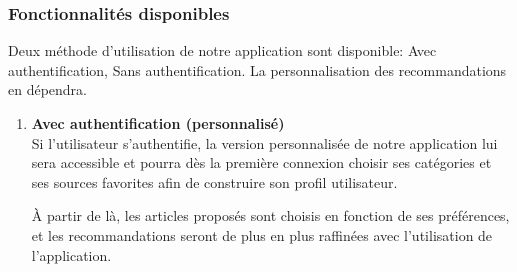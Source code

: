     \subsubsection{Fonctionnalités disponibles}
    Deux méthode d'utilisation de notre application sont disponible: Avec authentification, Sans authentification. La personnalisation des recommandations en dépendra.
    \begin{enumerate}[leftmargin=*]
        \item\textbf{Avec authentification (personnalisé)}\\
        Si l'utilisateur s'authentifie, la version personnalisée de notre application lui sera accessible et pourra dès la première connexion choisir ses catégories et ses sources favorites afin de construire son profil utilisateur.

        À partir de là, les articles proposés sont choisis en fonction de ses préférences, et les recommandations seront de plus en plus raffinées avec l'utilisation de l'application.


\end{enumerate}
